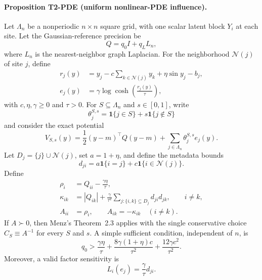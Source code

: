 \paragraph{Proposition T2-PDE (uniform nonlinear-PDE influence).}
Let $\Lambda_n$ be a nonperiodic $n\times n$ square grid, with one scalar
latent block $Y_i$ at each site.  Let the Gaussian-reference precision be
\[
    Q=q_0 I+q_L L_n,
\]
where $L_n$ is the nearest-neighbor graph Laplacian.  For the neighborhood
$\mathcal N(j)$ of site $j$, define
\begin{align}
    r_j(y)
    &=y_j-c\sum_{k\in\mathcal N(j)}y_k+\eta\sin y_j-b_j,
    \label{eq:pde-residual}\\
    e_j(y)
    &=\gamma\log\cosh\!\left(\frac{r_j(y)}{\tau}\right),
    \label{eq:pde-factor}
\end{align}
with $c,\eta,\gamma\ge0$ and $\tau>0$.  For $S\subseteq\Lambda_n$ and
$s\in[0,1]$, write
\[
    \theta_j^{S,s}=\mathbf 1\{j\in S\}
      +s\mathbf 1\{j\notin S\}
\]
and consider the exact potential
\begin{equation}
    V_{S,s}(y)
    =\frac12(y-m)^\top Q(y-m)
     +\sum_{j\in\Lambda_n}\theta_j^{S,s}e_j(y).
    \label{eq:pde-path-potential}
\end{equation}
Let $D_j=\{j\}\cup\mathcal N(j)$, set $a=1+\eta$, and define the
metadata bounds
\[
    d_{ji}=a\mathbf 1\{i=j\}
      +c\mathbf 1\{i\in\mathcal N(j)\}.
\]
Define
\begin{align}
    \rho_i
    &=Q_{ii}-\frac{\gamma\eta}{\tau},
    \label{eq:pde-rho}\\
    \kappa_{ik}
    &=|Q_{ik}|+\frac{\gamma}{\tau^2}
      \sum_{j:\{i,k\}\subseteq D_j}d_{ji}d_{jk},
      \qquad i\ne k,
    \label{eq:pde-kappa}\\
    A_{ii}&=\rho_i,
    \qquad A_{ik}=-\kappa_{ik}\quad(i\ne k).
    \label{eq:pde-comparison}
\end{align}
If $A\succ0$, then Menz's Theorem~2.3 applies with the single conservative
choice $C_S\equiv A^{-1}$ for every $S$ and $s$.  A simple sufficient
condition, independent of $n$, is
\begin{equation}
    q_0>
    \frac{\gamma\eta}{\tau}
    +\frac{8\gamma(1+\eta)c}{\tau^2}
    +\frac{12\gamma c^2}{\tau^2}.
    \label{eq:pde-diagonal-dominance}
\end{equation}
Moreover, a valid factor sensitivity is
\begin{equation}
    L_i(e_j)=\frac{\gamma}{\tau}d_{ji}.
    \label{eq:pde-factor-sensitivity}
\end{equation}

